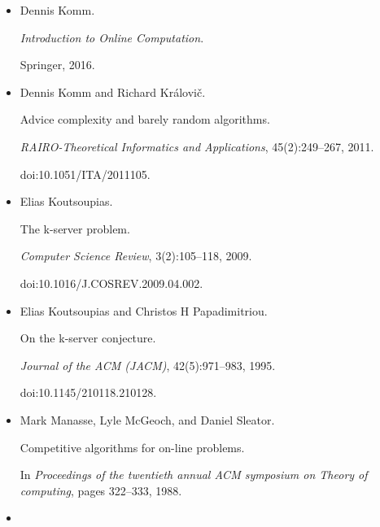 \documentclass[10pt,a4paper]{article}
\begin{document}
\begin{itemize}
doi:10.1145/103418.103448.





\item[] 
[26]

Dennis Komm.


\emph{Introduction to Online Computation}.


Springer, 2016.





\item[] 
[27]

Dennis Komm and Richard Královič.


Advice complexity and barely random algorithms.


\emph{RAIRO-Theoretical Informatics and Applications}, 45(2):249–267,
2011.


doi:10.1051/ITA/2011105.





\item[] 
[28]

Elias Koutsoupias.


The k-server problem.


\emph{Computer Science Review}, 3(2):105–118, 2009.


doi:10.1016/J.COSREV.2009.04.002.





\item[] 
[29]

Elias Koutsoupias and Christos H Papadimitriou.


On the k-server conjecture.


\emph{Journal of the ACM (JACM)}, 42(5):971–983, 1995.


doi:10.1145/210118.210128.





\item[] 
[30]

Mark Manasse, Lyle McGeoch, and Daniel Sleator.


Competitive algorithms for on-line problems.


In \emph{Proceedings of the twentieth annual ACM symposium on Theory
of computing}, pages 322–333, 1988.





\item[] 
[31]


\end{itemize}
\end{document}
